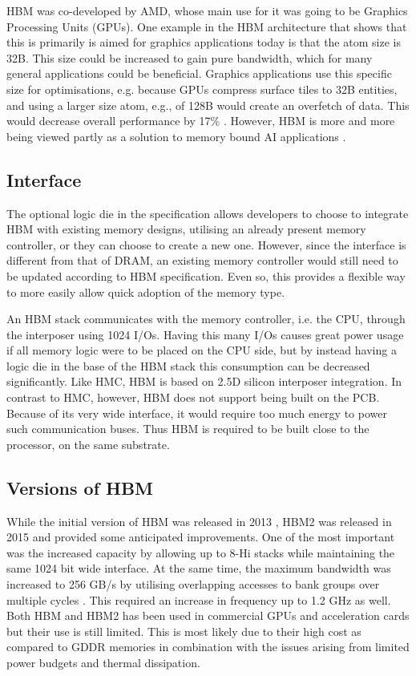 HBM was co-developed by AMD, whose main use for it was going to be Graphics Processing Units (GPUs). One example in the HBM architecture that shows that this is primarily is aimed for graphics applications today is that the atom size is 32B. This size could be increased to gain pure bandwidth, which for many general applications could be beneficial. Graphics applications use this specific size for optimisations, e.g. because GPUs compress surface tiles to 32B entities, and using a larger size atom, e.g., of 128B would create an overfetch of data. This would decrease overall performance by 17\% \cite{O'Connor:2017:FDE:3123939.3124545}. However, HBM is more and more being viewed partly as a solution to memory bound AI applications \cite{sperling_2019}.

\subsection{Interface}
The optional logic die in the specification allows developers to choose to integrate HBM with existing memory designs, utilising an already present memory controller, or they can choose to create a new one. However, since the interface is different from that of DRAM, an existing memory controller would still need to be updated according to HBM specification. Even so, this provides a flexible way to more easily allow quick adoption of the memory type.
\bigskip

An HBM stack communicates with the memory controller, i.e. the CPU, through the interposer using 1024 I/Os. Having this many I/Os causes great power usage if all memory logic were to be placed on the CPU side, but by instead having a logic die in the base of the HBM stack this consumption can be decreased significantly. Like HMC, HBM is based on 2.5D silicon interposer integration. In contrast to HMC, however, HBM does not support being built on the PCB. Because of its very wide interface, it would require too much energy to power such communication buses. Thus HBM is required to be built close to the processor, on the same substrate.

\subsection{Versions of HBM}
While the initial version of HBM was released in 2013 \cite{standard2013high}, HBM2 was released in 2015 \cite{standard2015high} and provided some anticipated improvements. One of the most important was the increased capacity by allowing up to 8-Hi stacks while maintaining the same 1024 bit wide interface. At the same time, the maximum bandwidth was increased to 256 GB/s by utilising overlapping accesses to bank groups over multiple cycles \cite{O'Connor:2017:FDE:3123939.3124545}. This required an increase in frequency up to 1.2 GHz as well. Both HBM and HBM2 has been used in commercial GPUs and acceleration cards but their use is still limited. This is most likely due to their high cost as compared to GDDR memories in combination with the issues arising from limited power budgets and thermal dissipation.
\bigskip

